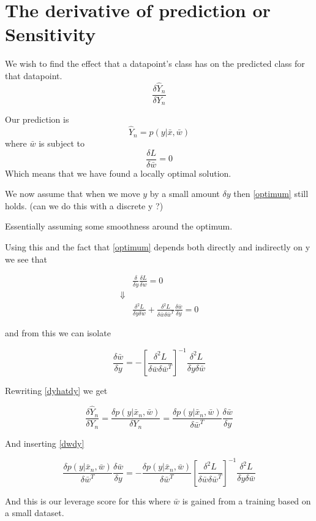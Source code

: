 
\section{The derivative of prediction or Sensitivity}
We wish to find the effect that a datapoint's class has on the predicted class for that datapoint.
\begin{equation}
\label{dyhatdy}
\frac{\delta \hat{Y}_n}{\delta Y_n}
\end{equation}

Our prediction is 
\begin{equation}
 \hat{Y}_n = p(y|\bar{x},\bar{w})
\end{equation}
where $\bar{w}$ is subject to 
\begin{equation}
\label{optimum}
\frac{\delta L}{\delta\bar{w}}=0
\end{equation}
Which means that we have found a locally optimal solution.

We now assume that when we move $y$ by a small amount $\delta y$ then \ref{optimum} still holds. (can we do this with a discrete y ?)

Essentially assuming some smoothness around the optimum.

Using this and the fact that \ref{optimum} depends both directly and indirectly on y we see that

\begin{eqnarray*}
&\frac{\delta}{\delta y} \frac{\delta L}{\delta w} = 0\\
\Downarrow & \\
&\frac{\delta^2 L}{\delta y \delta \bar{w}} + \frac{\delta^2 L}{\delta \bar{w} \delta \bar{w}^T} \frac{\delta \bar{w}}{\delta y}= 0
\end{eqnarray*}

and from this we can isolate

\begin{equation}
\label{dwdy}
\frac{\delta \bar{w}}{\delta y} = - \left[ \frac{\delta^2 L}{\delta \bar{w} \delta \bar{w}^T} \right]^{-1} \frac{\delta^2 L}{\delta y \delta \bar{w}} 
\end{equation}

Rewriting \eqref{dyhatdy} we get

\begin{equation}
\frac{\delta \hat{Y}_n}{\delta Y_n} = \frac{\delta p(y|\bar{x}_n,\bar{w})}{\delta Y_n} =  \frac{\delta p(y|\bar{x}_n,\bar{w})}{\delta \bar{w}^T} \frac{\delta \bar{w}}{\delta y}
\end{equation}

And inserting \eqref{dwdy} 

\begin{equation}
\frac{\delta p(y|\bar{x}_n,\bar{w})}{\delta \bar{w}^T} \frac{\delta \bar{w}}{\delta y} = - \frac{\delta p(y|\bar{x}_n,\bar{w})}{\delta \bar{w}^T} \left[ \frac{\delta^2 L}{\delta \bar{w} \delta \bar{w}^T} \right]^{-1} \frac{\delta^2 L}{\delta y \delta \bar{w}}
\end{equation}

And this is our leverage score for this where $\bar{w}$ is gained from a training based on a small dataset.




